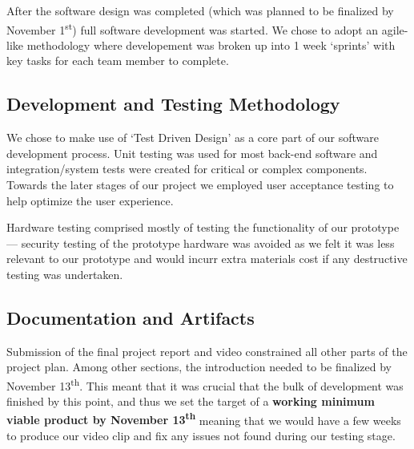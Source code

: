 \documentclass[conference]{IEEEtran}
\begin{document}
	After the software design was completed (which was planned to be finalized by November 1\textsuperscript{st}) full software development was started. We chose to adopt an agile-like methodology where developement was broken up into 1 week `sprints' with key tasks for each team member to complete.

\subsection{Development and Testing Methodology}
	We chose to make use of `Test Driven Design' as a core part of our software development process. Unit testing was used for most back-end software and integration/system tests were created for critical or complex components. Towards the later stages of our project we employed user acceptance testing to help optimize the user experience.

	Hardware testing comprised mostly of testing the functionality of our prototype --- security testing of the prototype hardware was avoided as we felt it was less relevant to our prototype and would incurr extra materials cost if any destructive testing was undertaken.

\subsection{Documentation and Artifacts}
	Submission of the final project report and video constrained all other parts of the project plan. Among other sections, the introduction needed to be finalized by November 13\textsuperscript{th}. This meant that it was crucial that the bulk of development was finished by this point, and thus we set the target of a \textbf{working minimum viable product by November 13\textsuperscript{th}} meaning that we would have a few weeks to produce our video clip and fix any issues not found during our testing stage.
\end{document}
